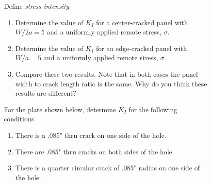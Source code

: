 \documentclass[12pt, oneside]{article}
\begin{document}
\begin{enumerate}

\begin{figure}[H]
	\item 
Define \emph{stress intensity}
\end{figure}


\begin{figure}[H]
	\item
\begin{enumerate}
	\item Determine the value of $K_I$ for a center-cracked panel with $W/2a = 5$ and a uniformly applied remote stress, $\sigma$.
	\item Determine the value of $K_I$ for an edge-cracked panel with $W/a = 5$ and a uniformly applied remote stress, $\sigma$.
	\item Compare these two results. Note that in both cases the panel width to crack length ratio is the same. Why do you think these results are different?
\end{enumerate}
\end{figure}

\begin{figure}[H]
	\item For the plate shown below, determine $K_I$ for the following conditions
	\begin{enumerate}
		\item There is a .085" thru crack on one side of the hole.
		\item There are .085" thru cracks on both sides of the hole.
		\item There is a quarter circular crack of .085" radius on one side of the hole.
	\end{enumerate}
	\centering
	\label{fig:problem3}
\end{figure}


\end{enumerate}
\end{document}
